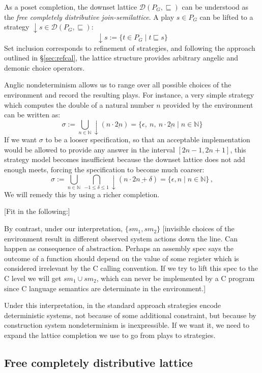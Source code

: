 \documentclass[format=sigplan,authordraft]{acmart}
\begin{document}
As a poset completion,
the downset lattice
$\mathcal{D}(P_G, {\sqsubseteq})$
can be understood as
the \emph{free completely distributive join-semilattice}.
A play $s \in P_G$ can be lifted to a strategy
${\downarrow} s \in \mathcal{D}(P_G, {\sqsubseteq})$:
\[
    {\downarrow} s := \{ t \in P_G \mid t \sqsubseteq s \}
\]
Set inclusion corresponds to refinement of strategies,
and following the approach outlined in \S\ref{sec:refcal},
the lattice structure provides
arbitrary angelic and demonic choice operators.

Anglic nondeterminism
allows us to range over all possible choices of the environment
and record the resulting plays.
For instance,
a very simple strategy which computes
the double of a natural number $n$
provided by the environment
can be written as:
\[
  \sigma :=
    \bigcup_{n \in \mathbb{N}} {\downarrow}(n \cdot \underline{2n}) =
    \{ \epsilon, \: n, \: n \cdot \underline{2n} \mid n \in \mathbb{N} \}
\]
If we want $\sigma$ to be a looser specification,
so that an acceptable implementation
would be allowed to provide any answer in the interval
$[2n - 1, 2n + 1]$,
this strategy model becomes insufficient
because the downset lattice does not add enough meets,
forcing the specification to become
much coarser:
\[
  \sigma :=
    \bigcup_{n \in \mathbb{N}} \:
    \bigcap_{-1 \le \delta \le 1}
    {\downarrow}(n \cdot \underline{2n+\delta}) =
    \{ \epsilon, n \mid n \in \mathbb{N} \} \,,
\]
We will remedy this by using a richer completion.

[Fit in the following:]

By contrast,
under our interpretation,
$\{ s m_1, s m_2 \}$
[invisible choices of the environment
result in different observed system actions down the line.
Can happen as consequence of abstraction.
Perhaps an assembly spec says
the outcome of a function should depend on the value of some
register which is considered irrelevant by the C calling convention.
If we try to lift this spec to the C level
we will get $s m_1 \cup s m_2$,
which can never be implemented by a C program
since C language semantics are determinate in the environment.]

Under this interpretation,
in the standard approach strategies encode deterministic systems,
not because of some additional constraint,
but because by construction system nondeterminism is inexpressible.
If we want it,
we need to expand the lattice completion we use
to go from plays to strategies.


\subsection{Free completely distributive lattice} \label{sec:fcd} %
\end{document}
